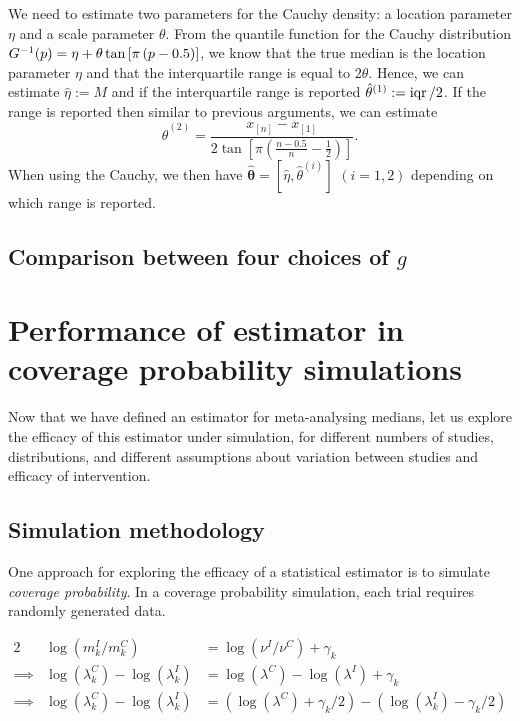 \documentclass{article}
\begin{document}
\noindent We need to estimate two parameters for the Cauchy density: a location parameter $\eta$ and a scale parameter $\theta$. From the quantile function for the Cauchy distribution $G^{-1}(p) = \eta + \theta\tan\left[\pi \left(p - 0.5 \right)\right]$, we know that the true median is the location parameter $\eta$ and that the interquartile range is equal to $2\theta$. Hence, we can estimate $\hat\eta := M$ and if the interquartile range is reported $\hat{\theta}^{(1)} := \operatorname{iqr}/ 2$.  If the range is reported then similar to previous arguments, we can estimate $$\hat{\theta}^{(2)} = \frac{x_{[n]} - x_{[1]}}{2\tan\left[\pi\left(\frac{n-0.5}{n}-\frac{1}{2}\right)\right]}.$$
When using the Cauchy, we then have $\hat{\bm{\theta}}=[\hat \eta, \hat{\theta}^{(i)}]$ $(i=1,2)$ depending on which range is reported.

\subsection{Comparison between four choices of $g$}
\label{sec: comparison}


\section{Performance of estimator in coverage probability simulations}

Now that we have defined an estimator for meta-analysing medians, let us explore the efficacy of this estimator under simulation, for different numbers of studies, distributions, and different assumptions about variation between studies and efficacy of intervention.

\subsection{Simulation methodology}

One approach for exploring the efficacy of a statistical estimator is to simulate \emph{coverage probability}. In a coverage probability simulation, each trial requires randomly generated data.


\begin{alignat*}{2}
\, & \log(m_k^I/m_k^C) & = \log(\nu^I/\nu^C) + \gamma_k\\
\implies & \log(\lambda_k^C) - \log(\lambda_k^I) & = \log(\lambda^C) - \log(\lambda^I) + \gamma_k\\
\implies & \log(\lambda_k^C) - \log(\lambda_k^I) & = (\log(\lambda^C) + \gamma_k/2) - (\log(\lambda_k^I) - \gamma_k/2)
\end{alignat*}
\end{document}
